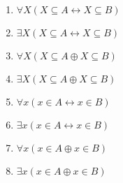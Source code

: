 \documentclass[12pt, oneside]{article}
\begin{document}
\begin{enumerate}
\begin{multicols}{2}
\begin{enumerate}[label=(\roman*)]
\item $\forall X ( X \subseteq A \leftrightarrow X \subseteq B)$
\item $\exists X ( X \subseteq A \leftrightarrow X \subseteq B)$
\item $\forall X ( X \subseteq A \oplus X \subseteq B)$
\item $\exists X ( X \subseteq A \oplus X \subseteq B)$
\item $\forall x ( x \in A \leftrightarrow x \in B)$
\item $\exists x ( x \in A \leftrightarrow x \in B)$
\item $\forall x ( x \in A \oplus x \in B)$
\item $\exists x ( x \in A \oplus x \in B)$
\end{enumerate}
\end{multicols}


\end{enumerate}
\end{document}

